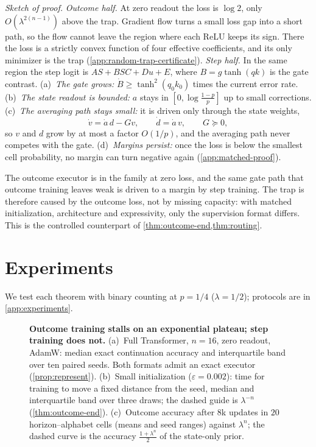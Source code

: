 \emph{Sketch of proof.} \emph{Outcome half.} At zero readout the loss is $\log2$, only
$O(\lambda^{2(n-1)})$ above the trap. Gradient flow turns a small loss gap into a short path, so the flow cannot
leave the region where each ReLU keeps its sign. There the loss is a strictly convex function of four
effective coefficients, and its only minimizer is the trap (\cref{app:random-trap-certificate}).
\emph{Step half.} In the same region the step logit is $AS+BSC+Du+E$, where $B=g\tanh(qk)$ is the gate contrast.
(a)~\emph{The gate grows:} $\dot B\ge\tanh^2(q_0k_0)$ times the current error rate.
(b)~\emph{The state readout is bounded:} $a$ stays in $[0,\log\frac{1-p}p]$ up to small corrections.
(c)~\emph{The averaging path stays small:} it is driven only through the state weights,
\[
 \dot v=\dot a\,d-Gv,\qquad \dot d=\dot a\,v,\qquad G\succeq0,
\]
so $v$ and $d$ grow by at most a factor $O(1/p)$, and the averaging path never competes with the gate.
(d)~\emph{Margins persist:} once the loss is below the smallest cell probability, no margin can turn
negative again (\cref{app:matched-proof}).

The outcome executor is in the family at zero loss, and the same gate path that outcome training leaves
weak is driven to a margin by step training. The trap is therefore caused by the outcome loss, not by
missing capacity: with matched initialization, architecture and expressivity, only the supervision format
differs. This is the controlled counterpart of \cref{thm:outcome-end,thm:routing}.

\suppressfloats[t]
\section{Experiments}
\label{sec:experiments}
\label{sec:validation}

We test each theorem with binary counting at $p=1/4$ ($\lambda=1/2$); protocols are in \cref{app:experiments}.

\begin{figure}[t]
\centering
\resizebox{\linewidth}{!}{}
\caption{\textbf{Outcome training stalls on an exponential plateau; step training does not.}
(a)~Full Transformer, $n=16$, zero readout, AdamW: median exact continuation accuracy and interquartile band over ten
paired seeds. Both formats admit an exact executor (\cref{prop:represent}).
(b)~Small initialization ($\varepsilon=0.002$): time for training to move a fixed distance from the seed, median and
interquartile band over three draws; the dashed guide is $\lambda^{-n}$ (\cref{thm:outcome-end}).
(c)~Outcome accuracy after $8$k updates in $20$ horizon--alphabet cells (means and seed ranges) against $\lambda^n$;
the dashed curve is the accuracy $\frac{1+\lambda^n}2$ of the state-only prior.}
\label{fig:experiments}
\end{figure}

